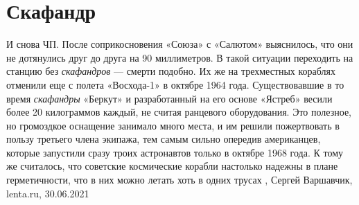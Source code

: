  
 
 
 
 
\chapter{Скафандр}
\label{sec:slova.skafandr}

И снова ЧП. После соприкосновения «Союза» с «Салютом» выяснилось, что они не
дотянулись друг до друга на 90 миллиметров. В такой ситуации переходить на
станцию без \emph{скафандров} — смерти подобно. Их же на трехместных кораблях
отменили еще с полета «Восхода-1» в октябре 1964 года.  Существовавшие в то
время \emph{скафандры} «Беркут» и разработанный на его основе «Ястреб» весили
более 20 килограммов каждый, не считая ранцевого оборудования. Это полезное, но
громоздкое оснащение занимало много места, и им решили пожертвовать в пользу
третьего члена экипажа, тем самым сильно опередив американцев, которые
запустили сразу троих астронавтов только в октябре 1968 года. К тому же
считалось, что советские космические корабли настолько надежны в плане
герметичности, что в них можно летать хоть в одних трусах
, Сергей Варшавчик, lenta.ru, 30.06.2021

